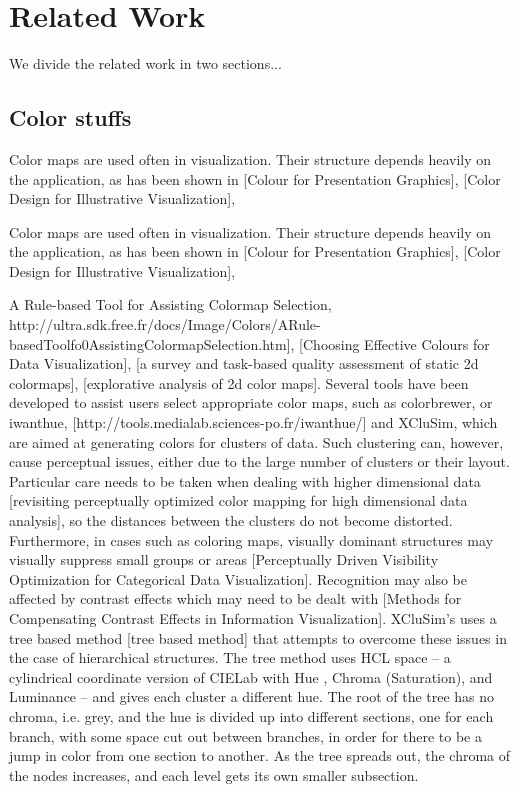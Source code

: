 \documentclass[review,journal]{vgtc}         %
\begin{document}
\section{Related Work}

We divide the related work in two sections...

\subsection{Color stuffs}


Color maps are used often in visualization. Their structure depends heavily on the application, as has been shown in [Colour for Presentation Graphics], [Color Design for Illustrative Visualization], 

Color maps are used often in visualization. 
Their structure depends heavily on the application, as has been shown in [Colour for Presentation Graphics], [Color Design for Illustrative Visualization], 

A Rule-based Tool for Assisting Colormap Selection, http://ultra.sdk.free.fr/docs/Image/Colors/ARule-basedToolfo0AssistingColormapSelection.htm], [Choosing Effective Colours for Data Visualization], 
[a survey and task-based quality assessment of static 2d colormaps], [explorative analysis of 2d color maps]. 
Several tools have been developed to assist users select appropriate color maps, such as colorbrewer, or iwanthue, [http://tools.medialab.sciences-po.fr/iwanthue/] and XCluSim, which are aimed at generating colors for clusters of data. 
Such clustering can, however, cause perceptual issues, either due to the large number of clusters or their layout. 
Particular care needs to be taken when dealing with higher dimensional data [revisiting perceptually optimized color mapping for high dimensional data analysis], so the distances between the clusters do not become distorted. 
Furthermore, in cases such as coloring maps, visually dominant structures may visually suppress small groups or areas [Perceptually Driven Visibility Optimization for Categorical Data Visualization].
Recognition may also be affected by contrast effects which may need to be dealt with [Methods for Compensating Contrast Effects in Information Visualization].
XCluSim’s uses a tree based method [tree based method] that attempts to overcome these issues in the case of hierarchical structures. 
The tree method uses HCL space – a cylindrical coordinate version of CIELab with Hue , Chroma (Saturation), and Luminance – and gives each cluster a different hue. 
The root of the tree has no chroma, i.e. grey, and the hue is divided up into different sections, one for each branch, with some space cut out between branches, in order for there to be a jump in color from one section to another. 
As the tree spreads out, the chroma of the nodes increases, and each level gets its own smaller subsection. 
\end{document}
